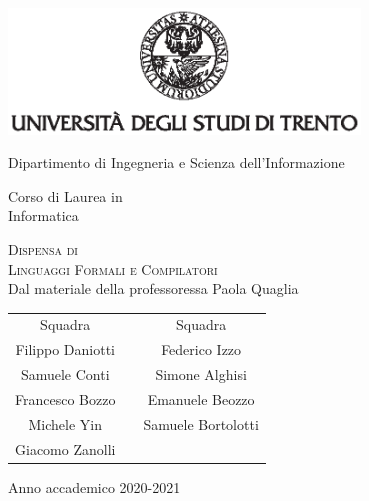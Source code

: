 \documentclass[class=book, crop=false, oneside]{standalone}
\begin{document}
\begin{titlepage}
	\centering
	\includegraphics[width=0.7\textwidth, keepaspectratio]{logo-unitn.eps}

	\vspace{1.3cm}
	\LARGE{Dipartimento di Ingegneria e Scienza dell'Informazione\\}

	\vspace{.9cm}
	\Large{Corso di Laurea in\\ Informatica}

	\vspace{.9cm}
	\Huge\textsc{Dispensa di\\Linguaggi Formali e Compilatori\\}
	\vspace{.2cm}
	\large{Dal materiale della professoressa Paola Quaglia}

	\vspace{1.8cm}
	\begin{tabularx}{\textwidth}{cXc}
		\Large{Squadra} & & \Large{Squadra} \\
		\cmidrule(lr){1-1} \cmidrule(lr){3-3}
		\large{Filippo Daniotti} & & \large{Federico Izzo} \\
		\large{Samuele Conti} & & \large{Simone Alghisi} \\
		\large{Francesco Bozzo} & & \large{Emanuele Beozzo} \\
		\large{Michele Yin} & & \large{Samuele Bortolotti} \\
		\large{Giacomo Zanolli} & & \\
	\end{tabularx}

	\vspace{1.4cm}
	\LARGE{Anno accademico 2020-2021}
\end{titlepage}
\end{document}
